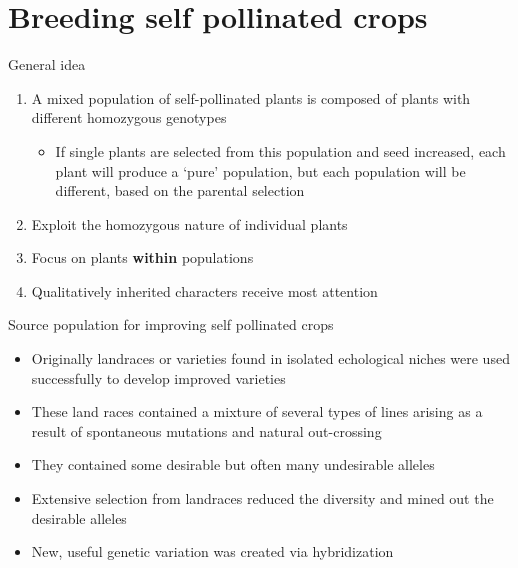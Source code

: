 \documentclass[11pt,ignorenonframetext,aspectratio=169]{beamer}
\providecommand{\tightlist}{%
  \setlength{\itemsep}{0pt}\setlength{\parskip}{0pt}}
\begin{document}
\hypertarget{breeding-self-pollinated-crops}{%
\section{Breeding self pollinated
crops}\label{breeding-self-pollinated-crops}}

\begin{frame}{General idea}
\protect\hypertarget{general-idea}{}
\begin{enumerate}
\tightlist
\item
  A mixed population of self-pollinated plants is composed of plants
  with different homozygous genotypes

  \begin{itemize}
  \tightlist
  \item
    If single plants are selected from this population and seed
    increased, each plant will produce a `pure' population, but each
    population will be different, based on the parental selection
  \end{itemize}
\item
  Exploit the homozygous nature of individual plants
\item
  Focus on plants \textbf{within} populations
\item
  Qualitatively inherited characters receive most attention
\end{enumerate}
\end{frame}

\begin{frame}{Source population for improving self pollinated crops}
\protect\hypertarget{source-population-for-improving-self-pollinated-crops}{}
\begin{itemize}
\tightlist
\item
  Originally landraces or varieties found in isolated echological niches
  were used successfully to develop improved varieties
\item
  These land races contained a mixture of several types of lines arising
  as a result of spontaneous mutations and natural out-crossing
\item
  They contained some desirable but often many undesirable alleles
\item
  Extensive selection from landraces reduced the diversity and mined out
  the desirable alleles
\item
  New, useful genetic variation was created via hybridization
\end{itemize}
\end{frame}
\end{document}
